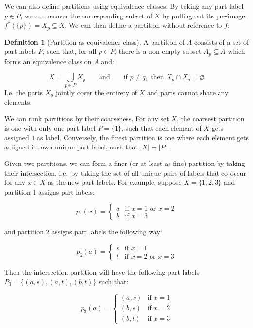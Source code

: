\documentclass[
  openany]{book}
\theoremstyle{definition}
\newtheorem{definition}{Definition}[chapter]
\theoremstyle{definition}
\theoremstyle{definition}
\theoremstyle{definition}
\theoremstyle{remark}
\begin{document}
We can also define partitions using equivalence classes. By taking any part label \(p \in P\), we can recover the corresponding subset of \(X\) by pulling out its pre-image: \(f^*(\{p\}) = X_p \subseteq X\). We can then define a partition without reference to \(f\):

\begin{definition}[Partition as equivalence class]
A partition of \(A\) consists of a set of part labels \(P\), such that, for all \(p \in P\), there is a non-empty subset \(A_p \subseteq A\) which forms an equivalence class on \(A\) and:

\[X = \bigcup_{p \in P} X_p \qquad \text{and} \qquad \text{if } p \neq q, \text{ then } X_p \cap X_q = \varnothing\]
I.e. the parts \(X_p\) jointly cover the entirety of \(X\) and parts cannot share any elements.
\end{definition}

We can rank partitions by their coarseness. For any set \(X\), the coarsest partition is one with only one part label \(P = \{ 1 \}\), such that each element of \(X\) gets assigned \(1\) as label. Conversely, the finest partition is one where each element gets assigned its own unique part label, such that \(\lvert X \lvert = \lvert P \lvert\).

Given two partitions, we can form a finer (or at least as fine) partition by taking their intersection, i.e.~by taking the set of all unique pairs of labels that co-occur for any \(x \in X\) as the new part labels. For example, suppose \(X = \{ 1, 2, 3 \}\) and partition 1 assigns part labels:

\[p_1(x) = \begin{cases} 
a & \text{if } x = 1 \text{ or } x = 2 \\
b & \text{if } x = 3
\end{cases}\]

and partition 2 assigns part labels the following way:

\[
p_2(a) = \begin{cases}
s & \text{if } x = 1 \\
t & \text{if } x = 2 \text{ or } x = 3
\end{cases}
\]

Then the intersection partition will have the following part labels \(P_3 = \{ (a, s), (a, t), (b, t) \}\) such that:

\[
p_3(a) = \begin{cases}
(a, s) & \text{if } x = 1 \\
(b, s) & \text{if } x = 2 \\ 
(b, t) & \text{if } x = 3
\end{cases}
\]
\end{document}
